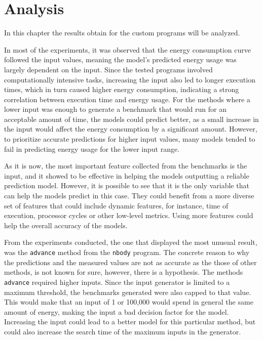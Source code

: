\section{Analysis} \label{sec:analysis}

In this chapter the results obtain for the custom programs will be analyzed.

In most of the experiments, it was observed that the energy consumption curve followed the input values, meaning the model's predicted energy usage was largely dependent on the input. Since the tested programs involved computationally intensive tasks, increasing the input also led to longer execution times, which in turn caused higher energy consumption, indicating a strong correlation between execution time and energy usage. 
For the methods where a lower input was enough to generate a benchmark that would run for an acceptable amount of time, the models could predict better, as a small increase in the input would affect the energy consumption by a significant amount. However, to prioritize accurate predictions for higher input values, many models tended to fail in predicting energy usage for the lower input range.

As it is now, the most important feature collected from the benchmarks is the input, and it showed to be effective in helping the models outputting a reliable prediction model. However, it is possible to see that it is the only variable that can help the models predict in this case. They could benefit from a more diverse set of features that could include dynamic features, for instance, time of execution, processor cycles or other low-level metrics. Using more features could help the overall accuracy of the models.

From the experiments conducted, the one that displayed the most unusual result, was the \texttt{advance} method from the \texttt{nbody} program. The concrete reason to why the predictions and the measured values are not as accurate as the those of other methods, is not known for sure, however, there is a hypothesis. The methods \texttt{advance} required higher inputs. Since the input generator is limited to a maximum threshold, the benchmarks generated were also capped to that value. This would make that an input of 1 or 100,000 would spend in general the same amount of energy, making the input a bad decision factor for the model. Increasing the input could lead to a better model for this particular method, but could also increase the search time of the maximum inputs in the generator.

